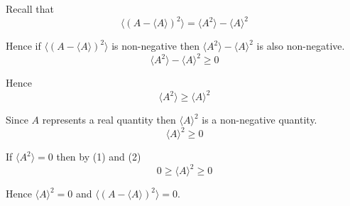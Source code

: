 


\bigskip
Recall that
\begin{equation*}
\langle(A-\langle A\rangle)^2\rangle=\langle A^2\rangle-\langle A\rangle^2
\end{equation*}

Hence if $\langle(A-\langle A\rangle)^2\rangle$ is non-negative then
$\langle A^2\rangle-\langle A\rangle^2$ is also non-negative.
\begin{equation*}
\langle A^2\rangle-\langle A\rangle^2\ge0
\end{equation*}

Hence
\begin{equation*}
\langle A^2\rangle\ge\langle A\rangle^2\tag{1}
\end{equation*}

Since $A$ represents a real quantity then $\langle A\rangle^2$ is a non-negative quantity.
\begin{equation*}
\langle A\rangle^2\ge0\tag{2}
\end{equation*}

If $\langle A^2\rangle=0$ then by (1) and (2)
\begin{equation*}
0\ge\langle A\rangle^2\ge0
\end{equation*}

Hence $\langle A\rangle^2=0$ and $\langle(A-\langle A\rangle)^2\rangle=0$.


